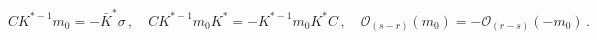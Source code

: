 \begin{equation}
CK^{\ast -1}m_{0}=-\bar{K}^{\ast }\sigma \,,\quad CK^{\ast -1}m_{0}K^{\ast
}=-K^{\ast -1}m_{0}K^{\ast }C\,,\quad \mathcal{O}_{(s-r)}(m_{0})=-\mathcal{O}%
_{(r-s)}(-m_{0})\,.  \label{eq:rel_matterCK}
\end{equation}

